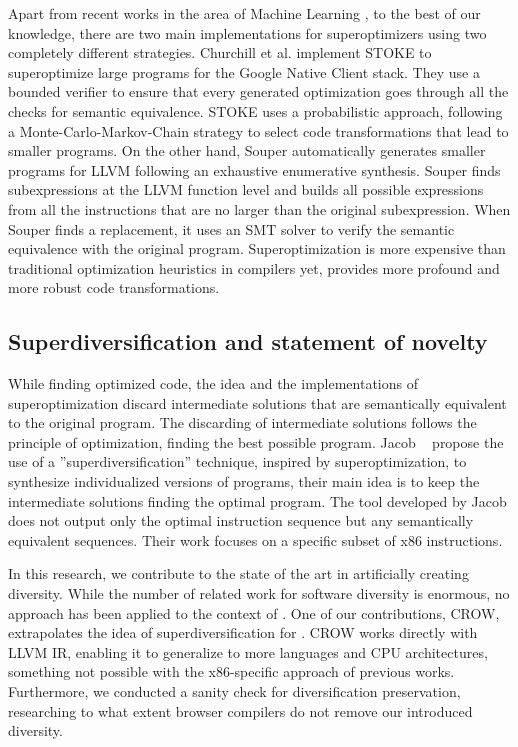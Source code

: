 Apart from recent works in the area of Machine Learning \cite{2021arXiv210913498S}, to the best of our knowledge, there are two main implementations for superoptimizers using two completely different strategies.
Churchill et al. \cite{churchill_sound_nodate} implement STOKE to superoptimize large programs for the  Google Native Client stack. They use a bounded verifier to ensure that every generated optimization goes through all the checks for semantic equivalence. STOKE uses a probabilistic approach, following a Monte-Carlo-Markov-Chain strategy to select code transformations that lead to smaller programs.
On the other hand, Souper \cite{bansal_automatic_nodate} automatically generates smaller programs for LLVM following an exhaustive enumerative synthesis. Souper finds subexpressions at the LLVM function level and builds all possible expressions from all the instructions that are no larger than the original subexpression. When Souper finds a replacement, it uses an SMT solver \cite{SMT_solver} to verify the semantic equivalence with the original program. 
Superoptimization is more expensive than traditional optimization heuristics in compilers yet, provides more profound and more robust code transformations.


\subsection*{Superdiversification and statement of novelty}

While finding optimized code, the idea and the implementations of superoptimization discard intermediate solutions that are semantically equivalent to the original program. The discarding of intermediate solutions follows the principle of optimization, finding the best possible program. Jacob \etal~\cite{jacob2008superdiversifier} propose the use of a ''superdiversification'' technique, inspired by superoptimization,
to synthesize individualized versions of programs, their main idea is to keep the intermediate solutions finding the optimal program.
The tool developed by Jacob \etal does not output only the optimal instruction sequence but any semantically equivalent sequences.
Their work focuses on a specific subset of x86 instructions.

In this research, we contribute to the state of the art in artificially creating diversity. While the number of related work for software diversity is enormous, no approach has been applied to the context of \wasm. One of our contributions, CROW, extrapolates the idea of superdiversification for \wasm. CROW works directly with LLVM IR, enabling it to generalize to more languages and CPU architectures, something not possible with the x86-specific approach of previous works.
Furthermore, we conducted a sanity check for diversification preservation, researching to what extent browser compilers do not remove our introduced diversity.

